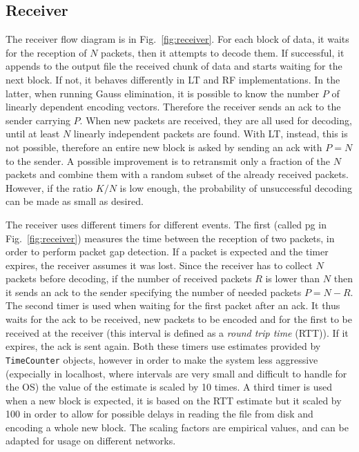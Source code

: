 \subsection{Receiver}
The receiver flow diagram is in Fig.~\ref{fig:receiver}. 
For each block of data, it waits for the reception of $N$ packets, then it attempts to decode them. If successful, it appends to the output file the received chunk of data and starts waiting for the next block. If not, it behaves differently in LT and RF implementations. In the latter, when running Gauss elimination, it is possible to know the number $P$ of linearly dependent encoding vectors. Therefore the receiver sends an ack to the sender carrying $P$. When new packets are received, they are all used for decoding, until at least $N$ %
linearly independent packets are found.
With LT, instead, this is not possible, therefore an entire new block is asked by sending an ack with $P=N$ to the sender. A possible improvement is to retransmit only a fraction of the $N$ packets and combine them with a random subset of the already received packets. However, if the ratio $K/N$ is low enough, the probability of unsuccessful decoding can be made as small as desired. 

The receiver uses different timers for different events. The first (called pg in Fig.~\ref{fig:receiver}) measures the time between the reception of two packets, in order to perform packet gap detection. If a packet is expected and the timer expires, the receiver assumes it was lost. Since the receiver has to collect $N$ packets before decoding, if the number of received packets $R$ is lower than $N$ then it sends an ack to the sender specifying the number of needed packets $P = N - R$. The second timer is used when waiting for the first packet after an ack. It thus waits for the ack to be received, new packets to be encoded and for the first to be received at the receiver (this interval is defined as a \textit{round trip time} (RTT)). If it expires, the ack is sent again. Both these timers use estimates provided by \texttt{TimeCounter} objects, however in order to make the system less aggressive (expecially in localhost, where intervals are very small and difficult to handle for the OS) the value of the estimate is scaled by 10 times. A third timer is used when a new block is expected, it is based on the RTT estimate but it scaled by 100 in order to allow for possible delays in reading the file from disk and encoding a whole new block. The scaling factors are empirical values, and can be adapted for usage on different networks.

